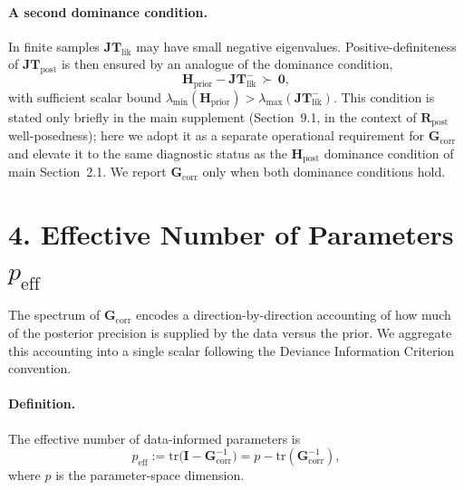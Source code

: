 \documentclass[11pt]{article}
\begin{document}
\paragraph{A second dominance condition.}
In finite samples $\mathbf{JT}_{\mathrm{lik}}$ may have small negative eigenvalues. Positive-definiteness of $\mathbf{JT}_{\mathrm{post}}$ is then ensured by an analogue of the dominance condition,
\begin{equation}
\mathbf H_{\mathrm{prior}} - \mathbf{JT}_{\mathrm{lik}}^{-}\, \succ\, \mathbf 0,
\label{eq:JT-dominance}
\end{equation}
with sufficient scalar bound $\lambda_{\min}(\mathbf H_{\mathrm{prior}}) > \lambda_{\max}(\mathbf{JT}_{\mathrm{lik}}^{-})$. This condition is stated only briefly in the main supplement (Section~9.1, in the context of $\mathbf R_{\mathrm{post}}$ well-posedness); here we adopt it as a separate operational requirement for $\mathbf G_{\mathrm{corr}}$ and elevate it to the same diagnostic status as the $\mathbf H_{\mathrm{post}}$ dominance condition of main Section~2.1. We report $\mathbf G_{\mathrm{corr}}$ only when both dominance conditions hold.

\section*{4. Effective Number of Parameters $p_{\mathrm{eff}}$}

The spectrum of $\mathbf G_{\mathrm{corr}}$ encodes a direction-by-direction accounting of how much of the posterior precision is supplied by the data versus the prior. We aggregate this accounting into a single scalar following the Deviance Information Criterion convention.

\paragraph{Definition.}
The effective number of data-informed parameters is
\begin{equation}
p_{\mathrm{eff}}
:=
\mathrm{tr}\bigl(\mathbf I - \mathbf G_{\mathrm{corr}}^{-1}\bigr)
=
p - \mathrm{tr}(\mathbf G_{\mathrm{corr}}^{-1}),
\label{eq:peff-def}
\end{equation}
where $p$ is the parameter-space dimension.
\end{document}
